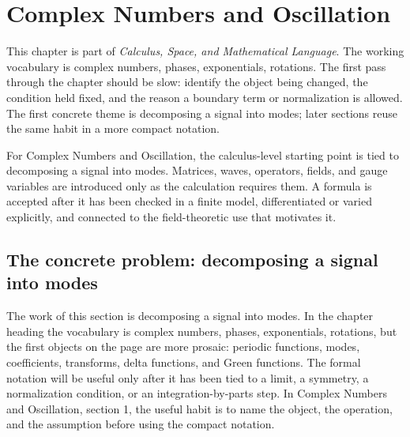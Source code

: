 \chapter{Complex Numbers and Oscillation}


This chapter is part of \emph{Calculus, Space, and Mathematical Language}.  The working vocabulary is complex numbers, phases, exponentials, rotations.  The first pass through the chapter should be slow: identify the object being changed, the condition held fixed, and the reason a boundary term or normalization is allowed.  The first concrete theme is decomposing a signal into modes; later sections reuse the same habit in a more compact notation.

For Complex Numbers and Oscillation, the calculus-level starting point is tied to decomposing a signal into modes.  Matrices, waves, operators, fields, and gauge variables are introduced only as the calculation requires them.  A formula is accepted after it has been checked in a finite model, differentiated or varied explicitly, and connected to the field-theoretic use that motivates it.

\section{The concrete problem: decomposing a signal into modes}













The work of this section is decomposing a signal into modes.  In the chapter heading the vocabulary is complex numbers, phases, exponentials, rotations, but the first objects on the page are more prosaic: periodic functions, modes, coefficients, transforms, delta functions, and Green functions.  The formal notation will be useful only after it has been tied to a limit, a symmetry, a normalization condition, or an integration-by-parts step.  In Complex Numbers and Oscillation, section 1, the useful habit is to name the object, the operation, and the assumption before using the compact notation.

